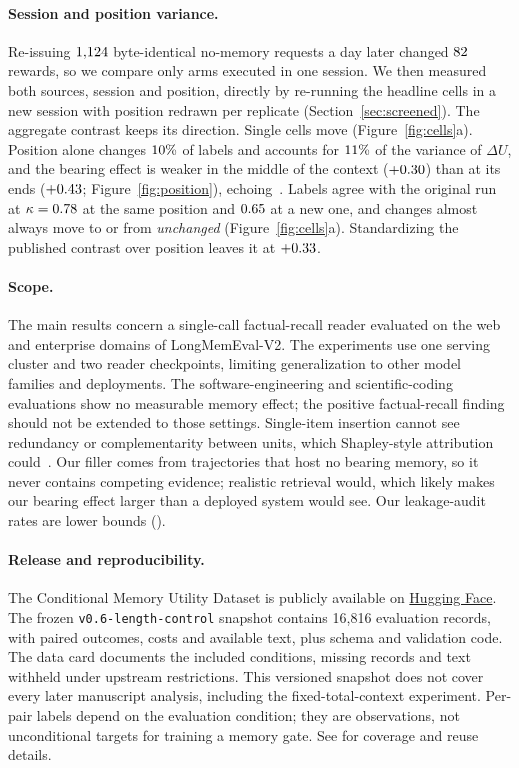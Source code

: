 \paragraph{Session and position variance.}
Re-issuing $1{,}124$ byte-identical no-memory requests a day later changed
$82$ rewards, so we compare only arms executed in one session. We then
measured both sources, session and position, directly by re-running the headline cells in a new session
with position redrawn per replicate (Section~\ref{sec:screened}). The aggregate
contrast keeps its direction. Single cells move (Figure~\ref{fig:cells}a). Position alone changes
$10\%$ of labels and accounts for $11\%$ of the variance of
$\Delta U$, and the bearing effect is weaker in the middle of the context
($+0.30$) than at its ends ($+0.43$; Figure~\ref{fig:position}),
echoing~\cite{lostmiddle}. Labels agree with the original run at
$\kappa = 0.78$ at the same position and $0.65$ at a new one, and
changes almost always move to or from \emph{unchanged} (Figure~\ref{fig:cells}a). Standardizing the published contrast over position leaves it at
$+0.33$.

\paragraph{Scope.}
The main results concern a single-call factual-recall reader evaluated on
the web and enterprise domains of LongMemEval-V2. The experiments use one
serving cluster and two reader checkpoints, limiting generalization to
other model families and deployments. The software-engineering and
scientific-coding evaluations show no measurable memory effect; the
positive factual-recall finding should not be extended to those settings. Single-item insertion cannot see
redundancy or complementarity between units, which Shapley-style attribution
could~\cite{meclear}. Our filler
comes from trajectories that host no bearing memory, so it never contains
competing evidence; realistic retrieval would, which likely makes our bearing
effect larger than a deployed system would see. Our leakage-audit rates are lower bounds ().

\paragraph{Release and reproducibility.}
\label{sec:release}
The Conditional Memory Utility Dataset is publicly available on
\href{https://huggingface.co/datasets/AgentsSci/AAMAS2027-ConditionalMemory}{Hugging Face}.
The frozen \texttt{v0.6-}\allowbreak\texttt{length-control} snapshot contains 16,816 evaluation
records, with paired outcomes, costs and available text, plus schema and
validation code. The data card documents the included conditions, missing
records and text withheld under upstream restrictions. This versioned snapshot
does not cover every later manuscript analysis, including the fixed-total-context
experiment. Per-pair labels depend on the evaluation condition; they are
observations, not unconditional targets for training a memory gate.
See  for coverage and reuse details.

